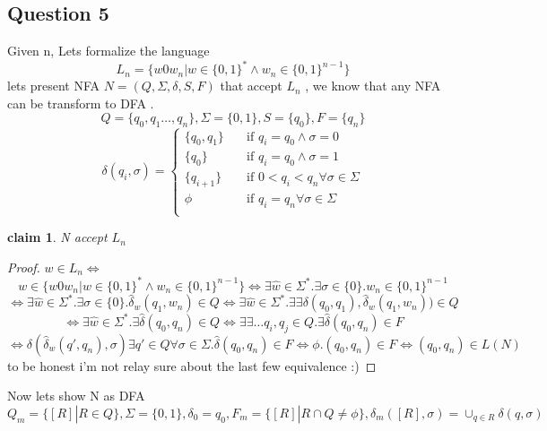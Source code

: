 \documentclass[12pt]{article}
\newtheorem{claim}[theorem]{claim}
\begin{document}
\subsection*{Question 5}
Given n, Lets formalize the language \[L_n=\lbrace w0w_n | w \in \lbrace 0,1\rbrace^* \wedge   w_n \in \lbrace 0,1\rbrace^{n-1}
\rbrace
\]
lets present NFA $N=(Q,\Sigma,\delta,S,F)$ that accept $L_n$ , we know that any NFA can be transform to DFA .\\
\[ Q=\lbrace q_0,q_1\dots ,q_{n} \rbrace 
,\Sigma =\lbrace 0,1\rbrace
,S =\lbrace q_0\rbrace 
,F =\lbrace q_{n}\rbrace \]
\[   
\delta(q_i,\sigma) = 
     \begin{cases} 
      \lbrace q_0,q_1   \rbrace  &\quad\text{if } q_i=q_0 \wedge \sigma=0 \\
       \lbrace q_0   \rbrace  &\quad\text{if     } q_i=q_0 \wedge \sigma=1 \\
        \lbrace q_{i+1}   \rbrace  &\quad \text{if } 0<q_{i}<q_n \forall \sigma \in \Sigma \\
          \phi  &\quad\text{if } q_i=q_n  \forall \sigma \in \Sigma \\ 
     \end{cases}     
\]
\begin{claim}
N accept $L_n$
\end{claim}
\begin{proof}
$w \in L_n \Leftrightarrow$ 
\[ w \in \lbrace w0w_n | w \in \lbrace 0,1\rbrace^* \wedge   w_n \in \lbrace 0,1\rbrace^{n-1}\rbrace
\Leftrightarrow
\exists \hat{w} \in \Sigma^*.\exists \sigma \in \lbrace 0\rbrace
.w_n \in \lbrace 0,1\rbrace^{n-1}
\]
\[
\Leftrightarrow
\exists \hat{w} \in \Sigma^*.\exists \sigma \in \lbrace 0\rbrace
.\hat{\delta}_w(q_1,w_{n})\in Q
\Leftrightarrow
\exists  \hat{w} \in \Sigma^*.\exists \exists \delta(q_0,q_1) ,\hat{\delta}_w(q_1,w_{n}))\in Q
\]
\[
\Leftrightarrow
\exists  \hat{w} \in \Sigma^*.\exists  \hat{\delta}(q_0,q_n)\in Q
\Leftrightarrow
\exists \exists \dots q_i,q_j\in Q.\exists  \hat{\delta}(q_0,q_n)\in F
\]
\[
 \Leftrightarrow \delta(\hat{\delta}_w(q',q_n),\sigma)\exists q' \in Q
 \forall \sigma \in \Sigma .\hat{\delta}(q_0,q_n)\in F \Leftrightarrow
 \phi.(q_0,q_n)\in F
 \Leftrightarrow
 (q_0,q_n)\in L(N)
\]
to be honest i'm not relay sure about the last few equivalence :)
\end{proof}
Now lets show N as DFA 
\[ Q_m=\lbrace [R]|R \in Q \rbrace 
,\Sigma =\lbrace 0,1\rbrace
,\delta_0 = q_0
,F_m =\lbrace [R]|R \cap Q \neq \phi \rbrace,\delta_m([R],\sigma) =\cup_{q \in R} \delta(q,\sigma )
 \]
 
\end{document}
